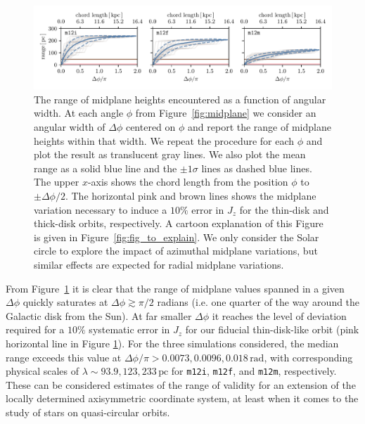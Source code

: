 \documentclass[twocolumn]{aastex62}
\newcommand{\pc}{\text{pc}}
\newcommand{\mi}{\texttt{m12i}}
\newcommand{\mf}{\texttt{m12f}}
\newcommand{\mm}{\texttt{m12m}}
\newcommand{\thincolor}{pink}
\newcommand{\thickcolor}{brown}
\begin{document}
\begin{figure}
\begin{center}
\includegraphics[width=\textwidth]{fig/range_dphi.pdf}
\end{center}
\caption{The range of midplane heights encountered as a function of angular
width. At each angle $\phi$ from Figure~\ref{fig:midplane} we consider an
angular width of $\Delta \phi$ centered on $\phi$ and report the range of
midplane heights within that width. We repeat the procedure for each $\phi$
and plot the result as translucent gray lines. We also plot the mean range as
a solid blue line and the $\pm1\sigma$ lines as dashed blue lines. The upper
$x$-axis shows the chord length from the position $\phi$ to $\pm\Delta\phi/2$.
The horizontal \thincolor{} and \thickcolor{} lines shows the midplane
variation necessary to induce a $10\%$ error in $J_z$ for the thin-disk and
thick-disk orbits, respectively. A cartoon explanation of this Figure is given
in Figure~\ref{fig:fig_to_explain}. We only consider the Solar circle to
explore the impact of azimuthal midplane variations, but similar effects are
expected for radial midplane variations.}
\label{fig:range_deltaphi}
\end{figure}

From Figure~\ref{fig:range_deltaphi} it is clear that the range of midplane
values spanned in a given $\Delta \phi$ quickly saturates at $\Delta \phi
\gtrsim \pi/2$ radians (i.e. one quarter of the way around the Galactic disk
from the Sun). At far smaller $\Delta \phi$ it reaches the level of deviation
required for a $10\%$ systematic error in $J_z$ for our fiducial
thin-disk-like orbit (\thincolor{} horizontal line in Figure
\ref{fig:range_deltaphi}). For the three simulations considered, the median
range exceeds this value at $\Delta \phi/\pi > 0.0073, 0.0096,
0.018\,\text{rad}$, with corresponding physical scales of $\lambda \sim 93.9,
123, 233\,\pc$ for \mi{}, \mf{}, and \mm{}, respectively. These can be
considered estimates of the range of validity for an extension of the locally
determined axisymmetric coordinate system, at least when it comes to the study
of stars on quasi-circular orbits.
\end{document}
